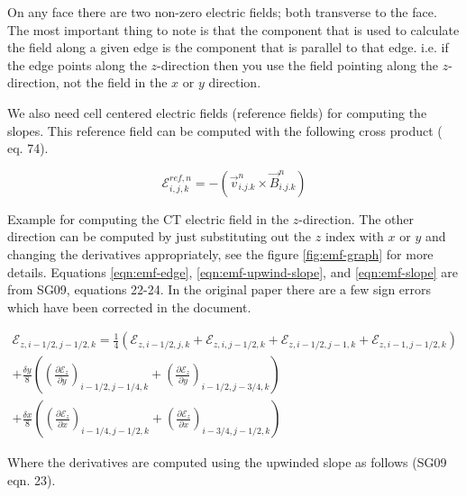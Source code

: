 On any face there are two non-zero electric fields; both transverse to the face. The most important thing to note is that the component that is used to calculate the field along a given edge is the component that is parallel to that edge. i.e. if the edge points along the $ z $-direction then you use the field pointing along the $ z $-direction, not the field in the $ x $ or $ y $ direction.

We also need cell centered electric fields (reference fields) for computing the slopes. This reference field can be computed with the following cross product (\cite{gardiner_2005} eq. 74).

\begin{equation}
    \mathcal{E}_{i,j,k}^{ref,n} = - \left( \vec{v}^{n}_{i.j.k} \times \vec{B}^{n}_{i.j.k} \right)
\end{equation}

Example for computing the CT electric field in the $ z $-direction. The other direction can be computed by just substituting out the $ z $ index with $ x $ or $ y $ and changing the derivatives appropriately, see the figure \ref{fig:emf-graph} for more details. Equations \ref{eqn:emf-edge}, \ref{eqn:emf-upwind-slope}, and \ref{eqn:emf-slope} are from SG09, equations 22-24. In the original paper there are a few sign errors which have been corrected in the document.

\begin{equation}
    \label{eqn:emf-edge}
    \begin{aligned}
        \mathcal{E}_{z, i-1/2, j-1/2, k} = \frac{1}{4} \left(
              \mathcal{E}_{z, i-1/2, j, k}
            + \mathcal{E}_{z, i, j-1/2, k}
            + \mathcal{E}_{z, i-1/2, j-1, k}
            + \mathcal{E}_{z, i-1, j-1/2, k}\right) \\
        + \frac{\delta y}{8} \left( \left( \frac{\partial \mathcal{E}_z }{\partial y} \right)_{i-1/2, j-1/4, k} + \left(  \frac{\partial \mathcal{E}_z }{\partial y} \right)_{i-1/2, j-3/4, k} \right) \\
        + \frac{\delta x}{8} \left( \left( \frac{\partial \mathcal{E}_z }{\partial x} \right)_{i-1/4, j-1/2, k} + \left(  \frac{\partial \mathcal{E}_z }{\partial x} \right)_{i-3/4, j-1/2, k} \right)
    \end{aligned}
\end{equation}

Where the derivatives are computed using the upwinded slope as follows (SG09 eqn. 23).

